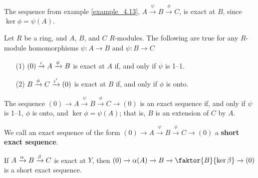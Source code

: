 \begin{example}\label{example_4.14}
    The sequence from example \ref{example_4.13}, $A \xrightarrow{\psi} B
    \xrightarrow{\phi} C$, is exact at $B$,  since $\ker{\phi}=\psi(A)$.
\end{example}

\begin{lemma}\label{4.5.1}
    Let $R$ be a ring, and  $A$,  $B$, and  $C$  $R$-modules. The following are
    true for any $R$-module homomorphisms $\psi:A \xrightarrow{} B$ and $\psi:B
    \xrightarrow{} C$
    \begin{enumerate}
        \item[(1)] $(0) \xrightarrow{\iota} A \xrightarrow{\psi} B$ is exact at $A$
            if, and only if $\psi$ is 1--1.

        \item[(2)] $B \xrightarrow{\phi} C \xrightarrow{\iota'} (0)$ is exact at
            $B$ if, and only if $\phi$ is onto.
    \end{enumerate}
\end{lemma}
\begin{corollary}
    The sequence $(0) \xrightarrow{} A \xrightarrow{\psi} B \xrightarrow{\phi} C
    \xrightarrow{} (0)$ is an exact sequence if, and only if $\psi$ is 1--1,
    $\phi$ is onto, and $\ker{\phi}=\psi(A)$; that is, $B$ is an extension of
    $C$ by  $A$.
\end{corollary}

\begin{definition}
    We call an exact sequence of the form $(0) \xrightarrow{} A \xrightarrow{\psi}
    B \xrightarrow{\phi} C \xrightarrow{} (0)$ a \textbf{short exact sequence}.
\end{definition}

\begin{lemma}\label{4.5.2}
    If $A \xrightarrow{\alpha} B \xrightarrow{\beta} C$ is exact at $Y$, then  $(0)
    \xrightarrow{} \a(A) \xrightarrow{} B \xrightarrow{} \faktor{B}{\ker{\b}}
    \xrightarrow{} (0)$ is a short exact sequence.
\end{lemma}

